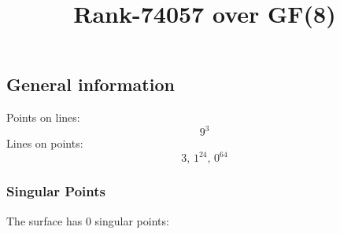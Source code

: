 \documentclass{article}
\newcommand\setTBstruts{\def\T{\rule{0pt}{2.6ex}}%
\def\B{\rule[-1.2ex]{0pt}{0pt}}}
\begin{document}
 
\setTBstruts



{\allowdisplaybreaks%






\title{Rank-74057 over GF(8)}
\author{}%
\maketitle%
%
{}



\subsection*{General information}
Points on lines:
$$
9^3$$
Lines on points:
$$
3,\,1^{24},\,0^{64}$$
\subsubsection*{Singular Points}
The surface has 0 singular points:\\
\begin{align*}
\end{align*}
}
\end{document}
